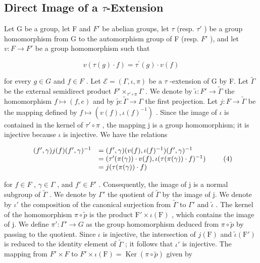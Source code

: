 \subsection{\texorpdfstring{Direct Image of a \(\tau\)-Extension}{Direct Image of a \textbackslash tau-Extension}}

Let G be a group, let F and \(F'\) be abelian groups, let \(\tau\) (resp. \(\tau'\) ) be a group homomorphism from G to the automorphism group of F (resp. \(F'\) ), and let \(v: F \to F'\) be a group homomorphism such that

\[
v (\tau (g) \cdot f) = \tau^ {\prime} (g) \cdot v (f)\tag{3}
\]

for every \(g \in G\) and \(f \in F\) . Let \(\mathcal{E} = (\Gamma, \iota, \pi)\) be a \(\tau\) -extension of G by F. Let \(\widetilde{\Gamma}\) be the external semidirect product \(F' \times_{\tau' \circ \pi} \Gamma\) . We denote by \(\widetilde{\iota}: F' \to \widetilde{\Gamma}\) the homomorphism \(f \mapsto (f, e)\) and by \(\widetilde{p}: \widetilde{\Gamma} \to \Gamma\) the first projection. Let \(j: F \to \widetilde{\Gamma}\) be the mapping defined by \(f \mapsto (v(f), \iota(f)^{-1})\) . Since the image of \(\iota\) is contained in the kernel of \(\tau' \circ \pi\) , the mapping j is a group homomorphism; it is injective because \(\iota\) is injective. We have the relations

\[
\begin{array}{r l} (f ^ {\prime}, \gamma) j (f) (f ^ {\prime}, \gamma) ^ {- 1} & = (f ^ {\prime}, \gamma) (v (f), \iota (f) ^ {- 1}) (f ^ {\prime}, \gamma) ^ {- 1} \\ & = (\tau^ {\prime} (\pi (\gamma)) \cdot v (f), \iota (\tau (\pi (\gamma)) \cdot f) ^ {- 1}) \\ & = j (\tau (\pi (\gamma)) \cdot f) \end{array}\tag{4}
\]

for \(f \in F\) , \(\gamma \in \Gamma\) , and \(f' \in F'\) . Consequently, the image of j is a normal subgroup of \(\widetilde{\Gamma}\) . We denote by \(\Gamma'\) the quotient of \(\widetilde{\Gamma}\) by the image of j. We denote by \(\iota'\) the composition of the canonical surjection from \(\widetilde{\Gamma}\) to \(\Gamma'\) and \(\widetilde{\iota}\) . The kernel of the homomorphism \(\pi \circ \widetilde{p}\) is the product \(\mathrm{F}' \times \iota(\mathrm{F})\) , which contains the image of j. We define \(\pi' : \Gamma' \to G\) as the group homomorphism deduced from \(\pi \circ \widetilde{p}\) by passing to the quotient. Since \(\iota\) is injective, the intersection of \(j(\mathrm{F})\) and \(\widetilde{\iota}(\mathrm{F}')\) is reduced to the identity element of \(\widetilde{\Gamma}\) ; it follows that \(\iota'\) is injective. The mapping from \(F' \times F\) to \(F' \times \iota(\mathrm{F}) = \operatorname{Ker}(\pi \circ \widetilde{p})\) given by

